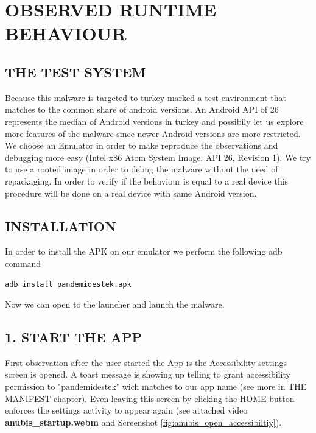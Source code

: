 \documentclass[10pt,titlepage]{article}
\begin{document}
\newpage
\section{OBSERVED RUNTIME BEHAVIOUR} \label{runtimebehaviour}

\subsection{THE TEST SYSTEM}

Because this malware is targeted to turkey marked a test environment that matches to the common share of android versions. An Android API of 26 represents the median of Android versions in turkey \cite{TURKEYANDROIDVERSIONS} and possibily let us explore more features of the malware since newer Android versions are more restricted. We choose an Emulator in order to make reproduce the observations and debugging more easy (Intel x86 Atom System Image, API 26, Revision 1). We try to use a rooted image in order to debug the malware without the need of repackaging. In order to verify if the behaviour is equal to a real device this procedure will be done on a real device with same Android version.


\subsection{INSTALLATION}
In order to install the APK on our emulator we perform the following adb command

\begin{verbatim}
adb install pandemidestek.apk
\end{verbatim}

Now we can open to the launcher and launch the malware.


\subsection{1. START THE APP}
First observation after the user started the App is the Accessibility settings screen is opened. A toast message is showing up telling to grant accessibility permission to "pandemidestek" wich matches to our app name (see more in THE MANIFEST chapter). Even leaving this screen by clicking the HOME button enforces the settings activity to appear again (see attached video \textbf{anubis\_startup.webm} and Screenshot \ref{fig:anubis_open_accessibiltiy}). 

\end{document}
